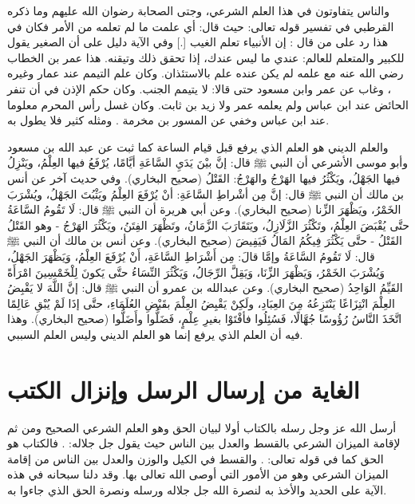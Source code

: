 والناس يتفاوتون في هذا العلم الشرعي، وجتى الصحابة رضوان الله عليهم وما ذكره القرطبي في تفسير قوله تعالى: 
\quranayah*[27][22]{\footnotesize \surahname*[27]}
حيث قال: أي علمت ما لم تعلمه من الأمر فكان في هذا رد على من قال : إن الأنبياء تعلم الغيب [.] وفي الآية دليل على أن الصغير يقول للكبير والمتعلم للعالم: عندي ما ليس عندك، إذا تحقق ذلك وتيقنه. هذا عمر بن الخطاب رضي الله عنه مع علمه لم يكن عنده علم بالاستئذان. وكان علم التيمم عند عمار وغيره ، وغاب عن عمر وابن مسعود حتى قالا: لا يتيمم الجنب. وكان حكم الإذن في أن تنفر الحائض عند ابن عباس ولم يعلمه عمر ولا زيد بن ثابت. وكان غسل رأس المحرم معلوما عند ابن عباس وخفي عن المسور بن مخرمة . ومثله كثير فلا يطول به. 

والعلم الديني هو العلم الذي يرفع قبل قيام الساعة كما ثبت عن عبد الله بن مسعود وأبو موسى الأشرعي أن النبي ﷺ قال: 
إنَّ بيْنَ يَدَيِ السَّاعَةِ أيَّامًا، يُرْفَعُ فيها العِلْمُ، ويَنْزِلُ فيها الجَهْلُ، ويَكْثُرُ فيها الهَرْجُ والهَرْجُ: القَتْلُ {\footnotesize (صحيح البخاري)}. وفي حديث آخر عن أنس بن مالك أن النبي ﷺ قال: إنَّ مِن أشْراطِ السَّاعَةِ: أنْ يُرْفَعَ العِلْمُ ويَثْبُتَ الجَهْلُ، ويُشْرَبَ الخَمْرُ، ويَظْهَرَ الزِّنا {\footnotesize (صحيح البخاري)}. وعن أبي هريرة أن النبي ﷺ قال: لَا تَقُومُ السَّاعَةُ حتَّى يُقْبَضَ العِلْمُ، وتَكْثُرَ الزَّلَازِلُ، ويَتَقَارَبَ الزَّمَانُ، وتَظْهَرَ الفِتَنُ، ويَكْثُرَ الهَرْجُ - وهو القَتْلُ القَتْلُ - حتَّى يَكْثُرَ فِيكُمُ المَالُ فَيَفِيضَ {\footnotesize (صحيح البخاري)}. وعن أنس بن مالك أن النبي ﷺ قال: 
لَا تَقُومُ السَّاعَةُ وإمَّا قالَ: مِن أَشْرَاطِ السَّاعَةِ، أَنْ يُرْفَعَ العِلْمُ، وَيَظْهَرَ الجَهْلُ، وَيُشْرَبَ الخَمْرُ، وَيَظْهَرَ الزِّنَا، وَيَقِلَّ الرِّجَالُ، وَيَكْثُرَ النِّسَاءُ حتَّى يَكونَ لِلْخَمْسِينَ امْرَأَةً القَيِّمُ الوَاحِدُ {\footnotesize (صحيح البخاري)}. وعن عبدالله بن عمرو أن النبي ﷺ قال: إنَّ اللَّهَ لا يَقْبِضُ العِلْمَ انْتِزَاعًا يَنْتَزِعُهُ مِنَ العِبَادِ، ولَكِنْ يَقْبِضُ العِلْمَ بقَبْضِ العُلَمَاءِ، حتَّى إذَا لَمْ يُبْقِ عَالِمًا اتَّخَذَ النَّاسُ رُؤُوسًا جُهَّالًا، فَسُئِلُوا فأفْتَوْا بغيرِ عِلْمٍ، فَضَلُّوا وأَضَلُّوا {\footnotesize (صحيح البخاري)}. وهذا فيه أن العلم الذي يرفع إنما هو العلم الديني وليس العلم السببي.

\section{الغاية من إرسال الرسل وإنزال الكتب}

أرسل الله عز وجل رسله بالكتاب أولا لبيان الحق وهو العلم الشرعي الصحيح ومن ثم لإقامة الميزان الشرعي بالقسط والعدل بين الناس حيث يقول جل جلاله:
\quranayah*[57][25]{\footnotesize \surahname*[57]}. فالكتاب هو الحق كما في قوله تعالى: \quranayah*[2][144][21]{\footnotesize \surahname*[2]}. والقسط في الكيل والوزن والعدل بين الناس من إقامة الميزان الشرعي وهو من الأمور التي أوصى الله تعالى بها. وقد دلنا سبحانه في هذه الآية على الحديد والأخذ به لنصرة الله جل جلاله ورسله ونصرة الحق الذي جاءوا به. 

